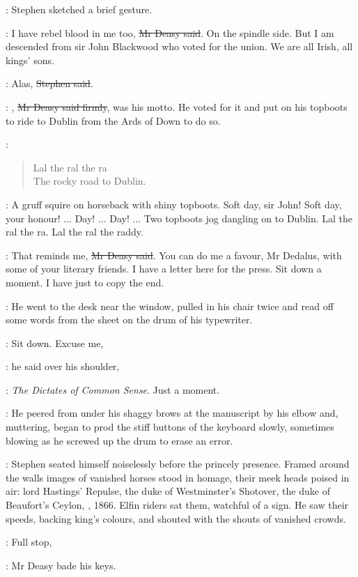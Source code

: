 :
Stephen sketched a brief gesture.

\deasy:
I have rebel blood in me too, \sout{Mr Deasy said}.
On the spindle side.
But I am descended from sir John Blackwood who voted for the union.
We are all Irish, all kings' sons.

\Stephen:
Alas, \sout{Stephen said}.

\deasy:
, \sout{Mr Deasy said firmly}, was his motto.
He voted for it and put on his topboots to ride to Dublin from the Ards of Down to do so.

\StephenInt:
\begin{verse}
    Lal the ral the ra \\
    The rocky road to Dublin.
\end{verse}

\StephenInt:
A gruff squire on horseback with shiny topboots.
Soft day, sir John!
Soft day, your honour!
... Day!
... Day!
... Two topboots jog dangling on to Dublin.
Lal the ral the ra.
Lal the ral the raddy.

\deasy:
That reminds me, \sout{Mr Deasy said}.
You can do me a favour, Mr Dedalus,
with some of your literary friends.
I have a letter here for the press.
Sit down a moment.
I have just to copy the end.

:
He went to the desk near the window,
pulled in his chair twice
and read off some words from the sheet on the drum of his typewriter.

\deasy:
Sit down.
Excuse me,

:
he said over his shoulder,

\deasy:
\emph{The Dictates of Common Sense}.
Just a moment.

:
He peered from under his shaggy brows at the manuscript by his elbow
and, muttering, began to prod the stiff buttons of the keyboard slowly,
sometimes blowing as he screwed up the drum to erase an error.

:
Stephen seated himself noiselessly before the princely presence.
Framed around the walls images of vanished horses stood in homage,
their meek heads poised in air:
lord Hastings' Repulse,
the duke of Westminster's Shotover,
the duke of Beaufort's Ceylon,
, 1866.
Elfin riders sat them, watchful of a sign.
He saw their speeds, backing king's colours,
and shouted with the shouts of vanished crowds.

\deasy:
Full stop,

:
Mr Deasy bade his keys.

